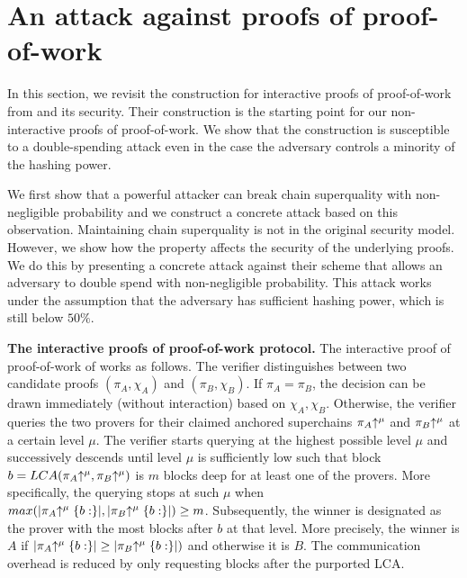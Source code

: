 \section{An attack against proofs of proof-of-work}

In this section, we revisit the construction for interactive proofs of
proof-of-work from \cite{KLS} and its security.  Their construction is the
starting point for our non-interactive proofs of proof-of-work. We show that the
construction is susceptible to  a double-spending attack even in the case the
adversary controls a minority of the hashing power.

We first show that a powerful attacker can break chain superquality with
non-negligible probability and we construct a concrete attack based on this
observation. Maintaining chain superquality is not in the original
security model. However, we show how the property affects the security of the
underlying proofs. We do this by presenting a concrete attack against their
scheme that allows an adversary to double spend with non-negligible probability.
This attack works under the assumption that the adversary has sufficient hashing
power, which is still below $50\%$.

\noindent
\textbf{The interactive proofs of proof-of-work protocol.}
The interactive proof of proof-of-work of \cite{KLS} works as follows. The
verifier distinguishes between two candidate proofs $(\pi_A, \chi_A)$ and
$(\pi_B, \chi_B)$. If $\pi_A = \pi_B$, the decision can be drawn immediately
(without interaction) based on $\chi_A,\chi_B$. Otherwise, the verifier queries
the two provers for their claimed anchored superchains $\pi_A\negthickspace\uparrow^\mu$ and
$\pi_B\negthickspace\uparrow^\mu$ at a certain level $\mu$. The verifier starts querying at
the highest possible level $\mu$ and successively descends until level $\mu$ is
sufficiently low such that block $b = LCA(\pi_A\negthickspace\uparrow^\mu, \pi_B\negthickspace\uparrow^\mu)$
is $m$ blocks deep for at least one of the provers. More specifically, the
querying stops at such $\mu$ when $max(|\pi_A\negthickspace\uparrow^\mu\{b:\}|,
|\pi_B\negthickspace\uparrow^\mu\{b:\}|) \geq m$. Subsequently, the winner is designated as
the prover with the most blocks after $b$ at that level. More precisely, the
winner is $A$ if $|\pi_A\negthickspace\uparrow^\mu\{b:\}| \geq |\pi_B\negthickspace\uparrow^\mu\{b:\}|)$ and
otherwise it is $B$. The communication overhead is reduced by only requesting
blocks after the purported LCA.

